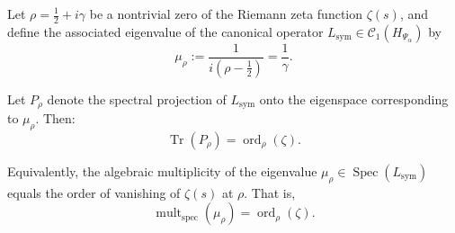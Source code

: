 \begin{lemma}
\label{lem:spectral_multiplicity_matching}
Let \( \rho = \tfrac{1}{2} + i\gamma \) be a nontrivial zero of the Riemann zeta function \( \zeta(s) \), and define the associated eigenvalue of the canonical operator \( L_{\mathrm{sym}} \in \mathcal{C}_1(H_{\Psi_\alpha}) \) by
\[
\mu_\rho := \frac{1}{i(\rho - \tfrac{1}{2})} = \frac{1}{\gamma}.
\]

Let \( P_\rho \) denote the spectral projection of \( L_{\mathrm{sym}} \) onto the eigenspace corresponding to \( \mu_\rho \). Then:
\[
\operatorname{Tr}(P_\rho) = \operatorname{ord}_\rho(\zeta).
\]

Equivalently, the algebraic multiplicity of the eigenvalue \( \mu_\rho \in \operatorname{Spec}(L_{\mathrm{sym}}) \) equals the order of vanishing of \( \zeta(s) \) at \( \rho \). That is,
\[
\operatorname{mult}_{\mathrm{spec}}(\mu_\rho) = \operatorname{ord}_\rho(\zeta).
\]
\end{lemma}
% 
